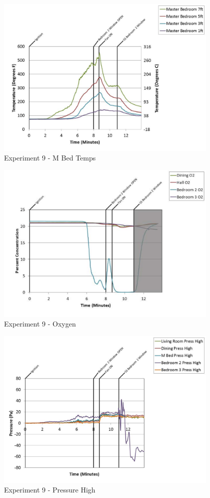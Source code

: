 \documentclass{article}
\begin{document}
\begin{appendices}
	\begin{figure}[h!]
		\centering
		\includegraphics[height=3.05in]{0_Images/Results_Charts/Exp_9_Charts/MBedTemps.pdf}
		\caption{Experiment 9 - M Bed Temps}
	\end{figure}
 
	\clearpage

	\begin{figure}[h!]
		\centering
		\includegraphics[height=3.05in]{0_Images/Results_Charts/Exp_9_Charts/Oxygen.pdf}
		\caption{Experiment 9 - Oxygen}
	\end{figure}
 

	\begin{figure}[h!]
		\centering
		\includegraphics[height=3.05in]{0_Images/Results_Charts/Exp_9_Charts/PressureHigh.pdf}
		\caption{Experiment 9 - Pressure High}
	\end{figure}
 

\end{appendices}
\end{document}
